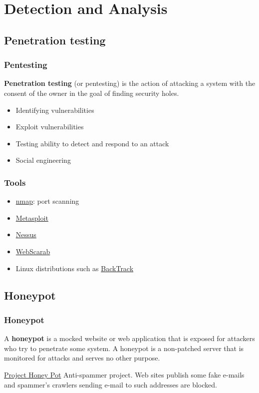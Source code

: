 \section{Detection and Analysis}

\subsection{Penetration testing}

\begin{frame}
\frametitle{Pentesting}
\textbf{Penetration testing} (or pentesting) is the action of attacking a
system with the consent of the owner in the goal of finding security holes.
\begin{itemize}
\item Identifying vulnerabilities
\item Exploit vulnerabilities
\item Testing ability to detect and respond to an attack
\item Social engineering
\end{itemize}
\end{frame}

\begin{frame}
\frametitle{Tools}
\begin{itemize}
\item \href{http://nmap.org/}{nmap}: port scanning
\item
\href{http://www.metasploit.com/about/penetration-testing-basics/}{Metasploit}
\item \href{http://www.tenable.com/products/nessus}{Nessus}
\item \href{https://www.owasp.org/index.php/Webscarab}{WebScarab}
\item Linux distributions such as
\href{http://www.backtrack-linux.org/}{BackTrack}
\end{itemize}
\end{frame}

\subsection{Honeypot}

\begin{frame}
\frametitle{Honeypot}
A \textbf{honeypot} is a mocked website or web application that is exposed for
attackers who try to penetrate some system. A honeypot is a non-patched server
that is monitored for attacks and serves no other purpose.
\begin{exampleblock}{\href{https://www.projecthoneypot.org/about_us.php}{Project Honey Pot}}
Anti-spammer project.
Web sites publish some fake e-mails and spammer's crawlers sending e-mail to
such addresses are blocked.
\end{exampleblock}
\end{frame}

